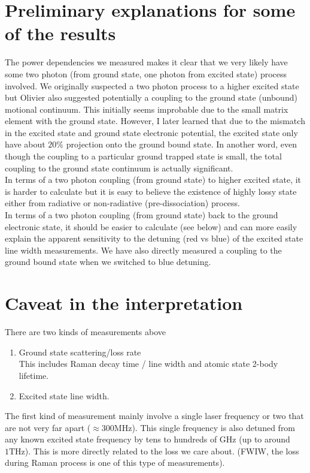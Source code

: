 \documentclass[10pt,fleqn]{article}
\begin{document}
\section{Preliminary explanations for some of the results}
The power dependencies we measured makes it clear that we very likely
have some two photon (from ground state, one photon from excited state) process involved.
We originally suspected a two photon process to a higher excited state but Olivier also
suggested potentially a coupling to the ground state (unbound) motional continuum.
This initially seems improbable due to the small matrix element with the ground state.
However, I later learned that due to the mismatch in the excited state and ground state
electronic potential, the excited state only have about $20\%$ projection onto the ground
bound state. In another word, even though the coupling to a particular ground trapped
state is small, the total coupling to the ground state continuum is actually significant.\\

In terms of a two photon coupling (from ground state) to higher excited state,
it is harder to calculate but it is easy to believe the existence of highly lossy
state either from radiative or non-radiative (pre-dissociation) process.\\

In terms of a two photon coupling (from ground state) back to the ground electronic state,
it should be easier to calculate (see below) and can more easily explain the apparent
sensitivity to the detuning (red vs blue) of the excited state line width measurements.
We have also directly measured a coupling to the ground bound state when we switched
to blue detuning.

\section{Caveat in the interpretation}

There are two kinds of measurements above
\begin{enumerate}
\item Ground state scattering/loss rate\\
  This includes Raman decay time / line width and atomic state 2-body lifetime.
\item Excited state line width.
\end{enumerate}

The first kind of measurement mainly involve a single laser frequency
or two that are not very far apart ($\approx 300 \mathrm{MHz}$).
This single frequency is also detuned from any known excited state frequency
by tens to hundreds of GHz (up to around $1 \mathrm{THz}$).
This is more directly related to the loss we care about.
(FWIW, the loss during Raman process is one of this type of measurements).\\
\end{document}
